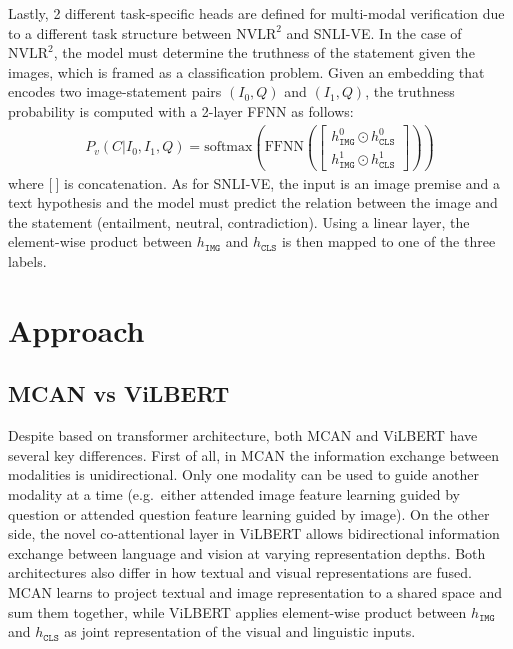 \documentclass{article}
\begin{document}
Lastly, 2 different task-specific heads are defined for multi-modal verification due to a different task structure between $\text{NVLR}^2$ and SNLI-VE. In the case of $\text{NVLR}^{2}$, the model must determine the truthness of the statement given the images, which is framed as a classification problem. Given an embedding that encodes two image-statement pairs $(I_{0}, Q)$ and $(I_{1}, Q)$, the truthness probability is computed with a 2-layer FFNN as follows:
\begin{align}
    P_{v}(C|I_{0}, I_{1}, Q) = \text{softmax}\left(\text{FFNN}\left(\begin{bmatrix} 
    h_{\mathtt{IMG}}^{0} \odot h_{\mathtt{CLS}}^{0} \\
    h_{\mathtt{IMG}}^{1} \odot h_{\mathtt{CLS}}^{1}
    \end{bmatrix}\right)\right)
\end{align}
where $\mathbb{[}\: \mathbb{]}$ is concatenation. As for SNLI-VE, the input is an image premise and a text hypothesis and the model must predict the relation between the image and the statement (entailment, neutral, contradiction). Using a linear layer, the element-wise product between $h_{\mathtt{IMG}}$ and $h_{\mathtt{CLS}}$ is then mapped to one of the three labels.



\section{Approach}
\subsection{MCAN vs ViLBERT}
Despite based on transformer architecture, both MCAN and ViLBERT have several key differences. First of all, in MCAN the information exchange between modalities is unidirectional. Only one modality can be used to guide another modality at a time (e.g.\ either attended image feature learning guided by question or attended question feature learning guided by image). On the other side, the novel co-attentional layer in ViLBERT allows bidirectional information exchange between language and vision at varying representation depths. Both architectures also differ in how textual and visual representations are fused. MCAN learns to project textual and image representation to a shared space and sum them together, while ViLBERT applies element-wise product between $h_{\mathtt{IMG}}$ and $h_{\mathtt{CLS}}$ as joint representation of the visual and linguistic inputs. 
\end{document}
